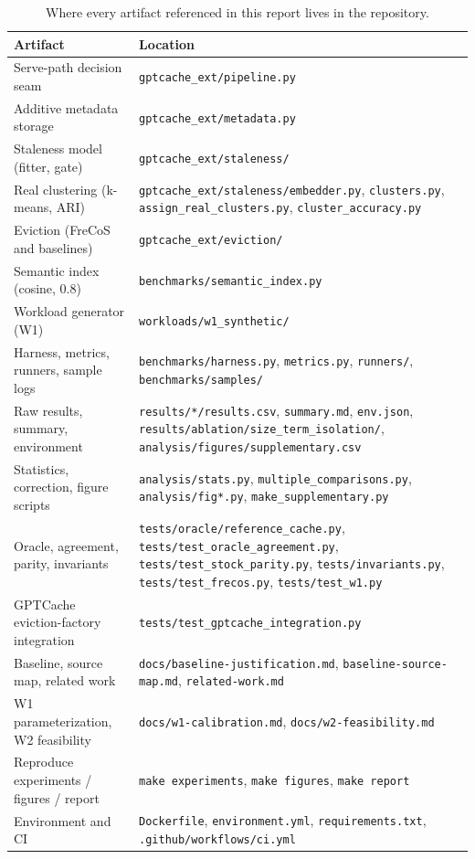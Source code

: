 \documentclass[10pt]{article}
\begin{document}
\begin{table}[H]
\centering
\small
\caption{Where every artifact referenced in this report lives in the repository.}
\label{tab:appendix}
\footnotesize
\setlength{\tabcolsep}{4pt}
\begin{tabular}{l>{\raggedright\arraybackslash}p{9.9cm}}
\toprule
Artifact & Location \\
\midrule
Serve-path decision seam & \texttt{gptcache\_ext/pipeline.py} \\
Additive metadata storage & \texttt{gptcache\_ext/metadata.py} \\
Staleness model (fitter, gate) & \texttt{gptcache\_ext/staleness/} \\
Real clustering (k-means, ARI) & \texttt{gptcache\_ext/staleness/embedder.py},
\texttt{clusters.py}, \texttt{assign\_real\_clusters.py}, \texttt{cluster\_accuracy.py} \\
Eviction (FreCoS and baselines) & \texttt{gptcache\_ext/eviction/} \\
Semantic index (cosine, 0.8) & \texttt{benchmarks/semantic\_index.py} \\
Workload generator (W1) & \texttt{workloads/w1\_synthetic/} \\
Harness, metrics, runners, sample logs & \texttt{benchmarks/harness.py},
\texttt{metrics.py}, \texttt{runners/}, \texttt{benchmarks/samples/} \\
Raw results, summary, environment & \texttt{results/*/results.csv},
\texttt{summary.md}, \texttt{env.json},
\texttt{results/ablation/\allowbreak size\_term\_isolation/},
\texttt{analysis/figures/\allowbreak supplementary.csv} \\
Statistics, correction, figure scripts & \texttt{analysis/stats.py},
\texttt{multiple\_comparisons.py}, \texttt{analysis/fig*.py},
\texttt{make\_supplementary.py} \\
Oracle, agreement, parity, invariants &
\texttt{tests/oracle/reference\_cache.py}, \texttt{tests/test\_oracle\_agreement.py},
\texttt{tests/test\_stock\_parity.py}, \texttt{tests/invariants.py},
\texttt{tests/test\_frecos.py}, \texttt{tests/test\_w1.py} \\
GPTCache eviction-factory integration & \texttt{tests/test\_gptcache\_integration.py} \\
Baseline, source map, related work & \texttt{docs/baseline-justification.md},
\texttt{baseline-source-map.md}, \texttt{related-work.md} \\
W1 parameterization, W2 feasibility & \texttt{docs/w1-calibration.md},
\texttt{docs/w2-feasibility.md} \\
Reproduce experiments / figures / report & \texttt{make experiments},
\texttt{make figures}, \texttt{make report} \\
Environment and CI & \texttt{Dockerfile}, \texttt{environment.yml},
\texttt{requirements.txt}, \texttt{.github/\allowbreak workflows/ci.yml} \\
\bottomrule
\end{tabular}
\end{table}
\end{document}

